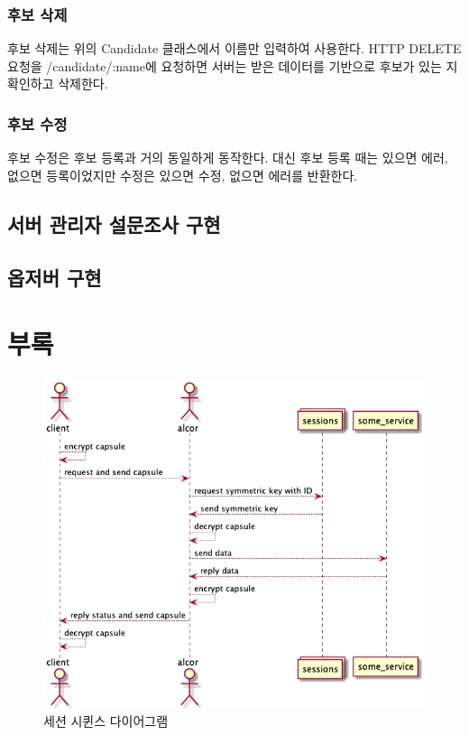 \documentclass[10pt,a4paper,left=15mm,right=15mm,top=20mm,bottom=20mm]{article}
\begin{document}
    \subsubsection{후보 삭제}

    후보 삭제는 위의 Candidate 클래스에서 이름만 입력하여 사용한다. HTTP DELETE 요청을 /candidate/:name에 요청하면 서버는 받은 데이터를 기반으로 후보가 있는 지 확인하고 삭제한다.

    \subsubsection{후보 수정}

    후보 수정은 후보 등록과 거의 동일하게 동작한다. 대신 후보 등록 때는 있으면 에러, 없으면 등록이었지만 수정은 있으면 수정, 없으면 에러를 반환한다.

\subsection{서버 관리자 설문조사 구현}

\subsection{옵저버 구현}

    \subsubsection{}

\newpage
\section{부록}

    \begin{figure}[h]
        \begin{center}
            \includegraphics[width=14cm]{sessions}
            \caption{세션 시퀸스 다이어그램}
        \end{center}
    \end{figure}
\end{document}

